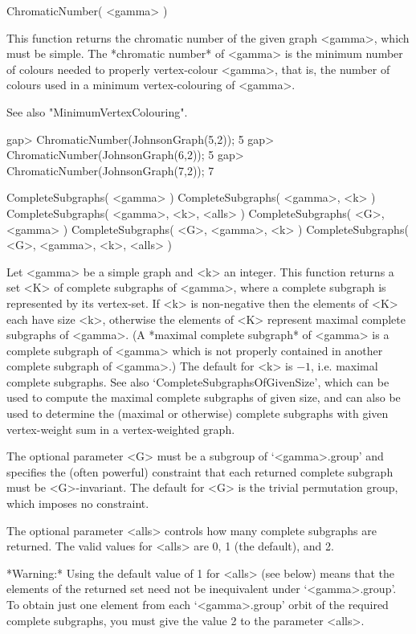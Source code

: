 \>ChromaticNumber( <gamma> )

This function returns the chromatic number of the given graph <gamma>,
which must be simple.  The *chromatic number*
of <gamma> is the minimum number of colours needed to properly vertex-colour
<gamma>, that is, the number of colours used in a minimum vertex-colouring
of <gamma>.

See also "MinimumVertexColouring".

\beginexample
gap> ChromaticNumber(JohnsonGraph(5,2));
5
gap> ChromaticNumber(JohnsonGraph(6,2));
5
gap> ChromaticNumber(JohnsonGraph(7,2));
7
\endexample


\>CompleteSubgraphs( <gamma> )
\>CompleteSubgraphs( <gamma>, <k> )
\>CompleteSubgraphs( <gamma>, <k>, <alls> )
\>CompleteSubgraphs( <G>, <gamma> )
\>CompleteSubgraphs( <G>, <gamma>, <k> )
\>CompleteSubgraphs( <G>, <gamma>, <k>, <alls> )

Let <gamma> be a simple graph and <k> an integer. This function returns
a set <K> of complete subgraphs of <gamma>, where a complete subgraph is
represented by its vertex-set.  If <k> is non-negative then the elements
of <K> each have size <k>, otherwise the elements of <K> represent maximal
complete subgraphs of <gamma>. (A *maximal complete subgraph* of <gamma>
is a complete subgraph of <gamma> which is not properly contained in
another complete subgraph of <gamma>.) The default for <k> is $-1$,
i.e. maximal complete subgraphs.  See also `CompleteSubgraphsOfGivenSize',
which can be used to compute the maximal complete subgraphs of given
size, and can also be used to determine the (maximal or otherwise)
complete subgraphs with given vertex-weight sum in a vertex-weighted
graph.

The optional parameter <G> must be a subgroup of `<gamma>.group' and
specifies the (often powerful) constraint that each returned complete
subgraph must be <G>-invariant. The default for <G> is the trivial
permutation group, which imposes no constraint.

The optional parameter <alls> controls how many complete subgraphs are
returned. The valid values for <alls> are 0, 1 (the default), and 2.

*Warning:* Using the default value of 1 for <alls> (see below) means
that the elements of the returned set need not be inequivalent under
`<gamma>.group'. To obtain just one element from each `<gamma>.group'
orbit of the required complete subgraphs, you must give the value 2 to
the parameter <alls>.

